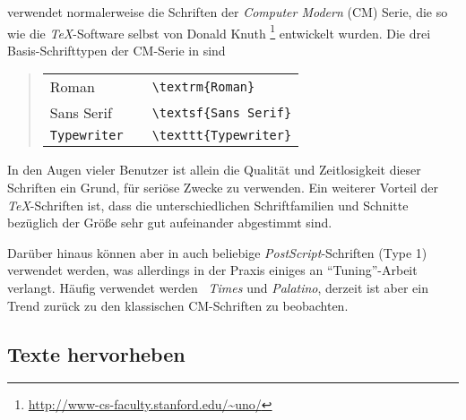 \latex verwendet normalerweise die Schriften der \emph{Computer
Modern}
(CM) Serie, die so wie die \emph{TeX}-Software selbst von Donald Knuth%
\footnote{\url{http://www-cs-faculty.stanford.edu/~uno/}} entwickelt
wurden. Die drei Basis-Schrifttypen der CM-Serie in \latex sind
%
\begin{quote}
\begin{tabular}{lcl}
\textrm{Roman}      & & \verb!\textrm{Roman}!\\
\textsf{Sans Serif} & & \verb!\textsf{Sans Serif}!\\
\texttt{Typewriter} & & \verb!\texttt{Typewriter}!\\
\end{tabular}
\end{quote}
%
\noindent In den Augen vieler Benutzer ist allein die Qualität und
Zeitlosigkeit dieser Schriften ein Grund, \latex für seriöse
Zwecke zu verwenden. Ein weiterer Vorteil der \emph{TeX}-Schriften
ist, dass die unterschiedlichen Schriftfamilien und Schnitte
bezüglich der Größe sehr gut aufeinander abgestimmt sind.

Darüber hinaus können aber in \latex auch beliebige 
\emph{PostScript}-Schrif\-ten (Type 1) verwendet werden, was allerdings in
der Praxis einiges an "`Tuning"'-Arbeit verlangt. Häufig verwendet
werden \zB\ \emph{Times} und \emph{Palatino}, derzeit ist aber ein Trend 
zurück zu den klassischen CM-Schriften zu beobachten.



\subsection{Texte hervorheben}

